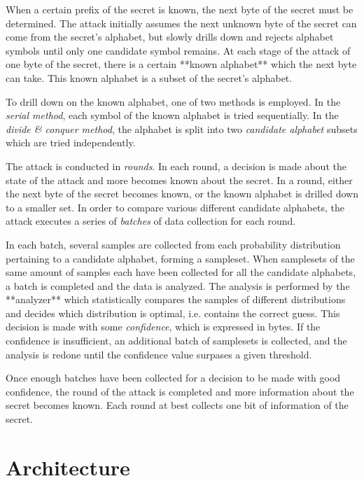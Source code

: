 When a certain prefix of the secret is known, the next byte of the secret must
be determined. The attack initially assumes the next unknown byte of the secret
can come from the secret's alphabet, but slowly drills down and rejects
alphabet symbols until only one candidate symbol remains. At each stage of the
attack of one byte of the secret, there is a certain **known alphabet** which
the next byte can take. This known alphabet is a subset of the secret's
alphabet.

To drill down on the known alphabet, one of two methods is employed. In the
\textit{serial method}, each symbol of the known alphabet is tried sequentially. In
the \textit{divide \& conquer method}, the alphabet is split into two \textit{candidate
alphabet} subsets which are tried independently.

The attack is conducted in \textit{rounds}. In each round, a decision is made
about the state of the attack and more becomes known about the secret. In a
round, either the next byte of the secret becomes known, or the known alphabet
is drilled down to a smaller set. In order to compare various different
candidate alphabets, the attack executes a series of \textit{batches} of data
collection for each round.

In each batch, several samples are collected from each probability distribution
pertaining to a candidate alphabet, forming a sampleset. When samplesets of the
same amount of samples each have been collected for all the candidate
alphabets, a batch is completed and the data is analyzed. The analysis is
performed by the **analyzer** which statistically compares the samples of
different distributions and decides which distribution is optimal, i.e.
contains the correct guess. This decision is made with some \textit{confidence},
which is expressed in bytes. If the confidence is insufficient, an additional
batch of samplesets is collected, and the analysis is redone until the
confidence value surpases a given threshold.

Once enough batches have been collected for a decision to be made with good
confidence, the round of the attack is completed and more information about the
secret becomes known. Each round at best collects one bit of information of the
secret.

\section{Architecture}\label{sec:architecture}


